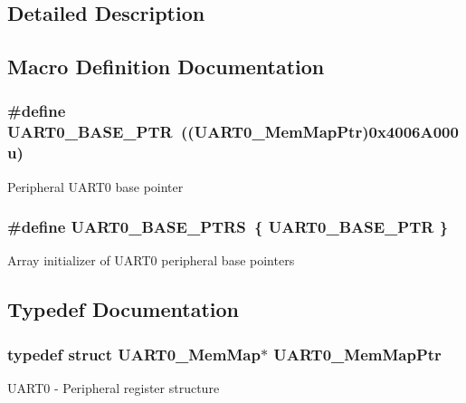 \subsection{Detailed Description}


\subsection{Macro Definition Documentation}
\hypertarget{group___u_a_r_t0___peripheral_ga50a02c91ffbd11fa7b4f0c33fe585199}{}
\subsubsection[{U\+A\+R\+T0\+\_\+\+B\+A\+S\+E\+\_\+\+P\+T\+R}]{\setlength{\rightskip}{0pt plus 5cm}\#define U\+A\+R\+T0\+\_\+\+B\+A\+S\+E\+\_\+\+P\+T\+R~(({\bf U\+A\+R\+T0\+\_\+\+Mem\+Map\+Ptr})0x4006\+A000u)}\label{group___u_a_r_t0___peripheral_ga50a02c91ffbd11fa7b4f0c33fe585199}
Peripheral U\+A\+R\+T0 base pointer \hypertarget{group___u_a_r_t0___peripheral_ga9416d89d2bc04eb37311da5910f1c701}{}
\subsubsection[{U\+A\+R\+T0\+\_\+\+B\+A\+S\+E\+\_\+\+P\+T\+R\+S}]{\setlength{\rightskip}{0pt plus 5cm}\#define U\+A\+R\+T0\+\_\+\+B\+A\+S\+E\+\_\+\+P\+T\+R\+S~\{ {\bf U\+A\+R\+T0\+\_\+\+B\+A\+S\+E\+\_\+\+P\+T\+R} \}}\label{group___u_a_r_t0___peripheral_ga9416d89d2bc04eb37311da5910f1c701}
Array initializer of U\+A\+R\+T0 peripheral base pointers 

\subsection{Typedef Documentation}
\hypertarget{group___u_a_r_t0___peripheral_gae795171499e041fb9b8f6ad5b97f896b}{}
\subsubsection[{U\+A\+R\+T0\+\_\+\+Mem\+Map\+Ptr}]{\setlength{\rightskip}{0pt plus 5cm}typedef struct {\bf U\+A\+R\+T0\+\_\+\+Mem\+Map}$\ast$ {\bf U\+A\+R\+T0\+\_\+\+Mem\+Map\+Ptr}}\label{group___u_a_r_t0___peripheral_gae795171499e041fb9b8f6ad5b97f896b}
U\+A\+R\+T0 -\/ Peripheral register structure 